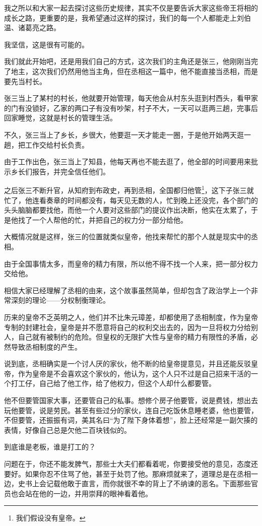 \begin{multicols}{\theparacolNo}
		我之所以和大家一起去探讨这些历史规律，其实不仅是要告诉大家这些帝王将相的成长之路，更重要的是，我希望通过这样的探讨，我们的每一个人都能走上刘伯温、诸葛亮之路。

		我坚信，这是很有可能的。

		我们就此开始吧，还是用我们自己的方式，这次我们的主角还是张三，他刚刚当完了地主，这次我们仍然用他当主角，但在丞相这一篇中，他不能直接当丞相，而是要先当村长。

		张三当上了某村的村长，他就要开始管理，每天他会从村东头逛到村西头，看甲家的门有没锁好，乙家的两口子有没有吵架，村子不大，一天可以逛两三趟，完事后回家睡觉，这就是村长的管理生活。

		不久，张三当上了乡长，乡很大，他要逛一天才能走一圈，于是他开始两天逛一趟，把工作交给村长负责。

		由于工作出色，张三当上了知县，他每天再也不能去逛了，他全部的时间要用来批示乡长们报告，并完全信任他们。

		之后张三不断升官，从知府到布政史，再到丞相，全国都归他管\footnote{我们假设没有皇帝。}，这下子张三就忙了，他连看奏章的时间都没有，每天见无数的人，忙到晚上还没完，各个部门的头头脑脑都要找他，而他一个人要对这些部门的提议作出决断，他实在太累了，于是他找了一个人帮他的忙，并把自己的权力分一部分给他。

		大概情况就是这样，张三的位置就类似皇帝，他找来帮忙的那个人就是现实中的丞相。

		由于全国事情太多，而皇帝的精力有限，所以他不得不找一个人来，把一部分权力交给他。

		相信大家已经理解了丞相的由来，这个故事虽然简单，但却包含了政治学上一个非常深刻的理论——分权制衡理论。

		历来的皇帝不乏英明之人，他们并不比朱元璋差，却都使用了丞相制度，作为皇帝专制的封建社会，皇帝是并不愿意将自己的权利交出去的，因为一旦将权力分给别人，自己就有被制约的危险。但皇权的无限扩大性与皇帝的精力有限性的矛盾，必然导致丞相制度的产生。

		说到底，丞相确实是一个讨人厌的家伙，他不断的给皇帝提意见，并且还能反驳皇帝，作为皇帝是不会喜欢这个家伙的，他认为，这个人只不过是自己招来干活的一个打工仔，自己给了他工作，给了他权力，但这个人却什么都要管。

		他不但要管国家大事，还要管自己的私事。想修个房子他要管，说是费钱，想出去玩他要管，说是劳民。甚至有些过分的家伙，连自己吃饭休息睡老婆，他也要管，不但要管，还振振有词，美其名曰“为了陛下身体着想”，脸上还经常是一副欠揍的表情，好像自己总是欠他二百块钱似的。

		到底谁是老板，谁是打工的？

		问题在于，你还不能发脾气，那些士大夫们都看着呢，你要接受他的意见，态度还要好。如果你忍不住骂了他，甚至于处罚了他。那麻烦就来了，道理总是在丞相一边，史书上会记载他敢于直言，而你就很不幸的背上了不纳谏的恶名。下面那些官员也会站在他的一边，并用崇拜的眼神看着他。


\end{multicols}

